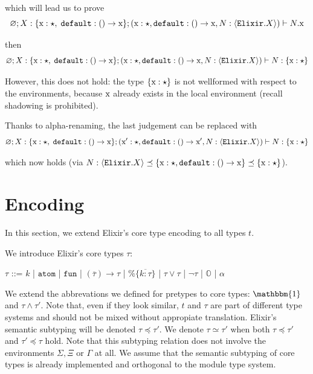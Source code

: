 \documentclass[12pt]{article}
\newcommand{\tx}{\text{\rm x}}
\newcommand{\emptyenv}{\varnothing}
\newcommand{\Gammatop}{\ensuremath{\Xi}}
\newcommand{\Gammabot}{\ensuremath{\Gamma}}
\newcommand{\atom}{\texttt{atom}}
\newcommand{\toptype}{\mathbbm{1}}
\newcommand{\fun}{\texttt{fun}}
\newcommand{\Elixir}{\texttt{Elixir}}
\begin{document}
which will lead us to prove
$$\emptyenv; X : \{ \tx : \star,\; \texttt{default} : () \rightarrow \tx \};\left(\tx : \star,  \texttt{default} : () \rightarrow \tx, N : \langle \Elixir.X \rangle \right) \vdash N.\tx$$

then
$$\emptyenv; X : \{ \tx : \star, \; \texttt{default} : () \rightarrow \tx \}; \left(\tx : \star, \texttt{default} : () \rightarrow \tx,  N : \langle \Elixir.X \rangle \right) \vdash N : \{ \tx : \star \}$$

However, this does not hold: the type $ \{ \tx : \star \}$
is not wellformed with respect to the environments, because $\tx$ already exists in the local environment (recall shadowing is
prohibited).

Thanks to alpha-renaming, the last judgement can be replaced with
$$\emptyenv; X : \{ \tx : \star, \; \texttt{default} : () \rightarrow \tx \}; \left(\tx' : \star, \texttt{default} : () \rightarrow \tx', N : \langle \Elixir.X \rangle \right) \vdash N : \{ \tx : \star \}$$

which now holds (via $N : \langle \Elixir.X \rangle \preceq \{ \tx : \star,  \texttt{default} : () \rightarrow \tx \} \preceq \{ \tx : \star \}$).

\section{Encoding}

In this section, we extend Elixir's core type encoding to all types $t$.

We introduce Elixir's core types $\tau$:

\begin{center}
    $\tau$ ::= $k$ | $\atom$ | $\fun$ | $(\overline{\tau}) \rightarrow \tau$ | $\%\{ \overline{k : \tau} \}$ | $\tau \vee \tau$ | $\lnot \tau$ | $\mathbb{O}$ | $\alpha$ \\
\end{center}

We extend the abbrevations we defined for pretypes to core types: $\toptype$ and $\tau \wedge \tau'$.
Note that, even if they look similar, $t$ and $\tau$ are part of different type systems and should not be mixed without appropiate translation.
Elixir's semantic subtyping will be denoted $\tau \preceq \tau'$.
We denote $\tau \simeq \tau'$ when both $\tau \preceq \tau'$ and
$\tau' \preceq \tau$ hold.
Note that this subtyping relation does not involve the
environments $\Sigma, \Gammatop$ or $\Gammabot$ at all.
We assume that the semantic subtyping of core types is already implemented and orthogonal to the module type system. \\
\end{document}
